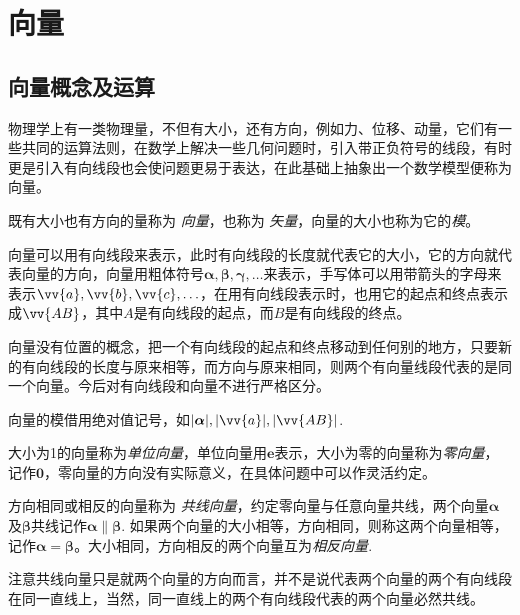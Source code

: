 
\section{向量}
\label{sec:vector}

\subsection{向量概念及运算}
\label{sec:vector-and-its-operation}


物理学上有一类物理量，不但有大小，还有方向，例如力、位移、动量，它们有一些共同的运算法则，在数学上解决一些几何问题时，引入带正负符号的线段，有时更是引入有向线段也会使问题更易于表达，在此基础上抽象出一个数学模型便称为向量。

\begin{definition}
  既有大小也有方向的量称为 \emph{向量}，也称为 \emph{矢量}，向量的大小也称为它的\emph{模}。
\end{definition}

向量可以用有向线段来表示，此时有向线段的长度就代表它的大小，它的方向就代表向量的方向，向量用粗体符号$\bm \alpha, \bm \beta, \bm \gamma, \ldots$来表示，手写体可以用带箭头的字母来表示$\vv{a}, \vv{b},\vv{c},\ldots$，在用有向线段表示时，也用它的起点和终点表示成$\vv{AB}$，其中$A$是有向线段的起点，而$B$是有向线段的终点。

向量没有位置的概念，把一个有向线段的起点和终点移动到任何别的地方，只要新的有向线段的长度与原来相等，而方向与原来相同，则两个有向量线段代表的是同一个向量。今后对有向线段和向量不进行严格区分。

向量的模借用绝对值记号，如$|\bm \alpha|,|\vv{a}|,|\vv{AB}|$.

\begin{definition}
大小为1的向量称为\emph{单位向量}，单位向量用$\bm{e}$表示，大小为零的向量称为\emph{零向量}，记作$\bm{0}$，零向量的方向没有实际意义，在具体问题中可以作灵活约定。
\end{definition}

\begin{definition}
  方向相同或相反的向量称为 \emph{共线向量}，约定零向量与任意向量共线，两个向量$\bm{\alpha}$及$\bm{\beta}$共线记作$\bm{\alpha} \parallel \bm{\beta}$. 如果两个向量的大小相等，方向相同，则称这两个向量相等，记作$\bm{\alpha}=\bm{\beta}$。大小相同，方向相反的两个向量互为\emph{相反向量}.
\end{definition}

注意共线向量只是就两个向量的方向而言，并不是说代表两个向量的两个有向线段在同一直线上，当然，同一直线上的两个有向线段代表的两个向量必然共线。

